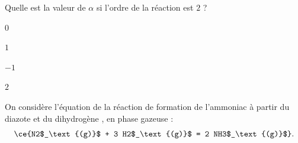 \reponse{\reponseC{}}



\begin{enonce}
	Quelle est la valeur de $\alpha$ si l'ordre de la réaction est $2$ ?
	\begin{listeQCM4Colonnes}
	\item $0$
	\item $1$
	\item $-1$
	\item $2$
	\end{listeQCM4Colonnes}
\end{enonce}

\reponse{\reponseC{}}


\finEntrainement



\newpage



\hauteurLargeurCadreReponse		{10mm}{2cm}
\initialisationEntrainement

On considère l'équation de la réaction de formation de l'ammoniac  à partir du diazote  et du dihydrogène , en phase gazeuse :
\[
\ce{N2$_\text{(g)}$ + 3 H2$_\text{(g)}$ = 2 NH3$_\text{(g)}$}.
\]

\debutEntrainement

